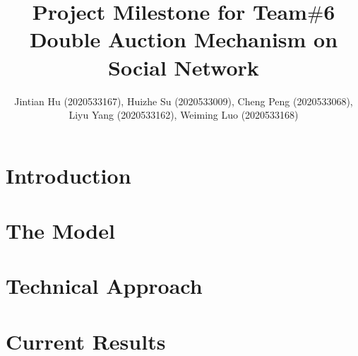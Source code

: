 \documentclass[format=acmsmall, review=false, natbib=false]{acmart}
\title{Project Milestone for Team$\#$6\\
	Double Auction Mechanism on Social Network
}
\author{Jintian Hu (2020533167), Huizhe Su (2020533009), Cheng Peng (2020533068), Liyu Yang (2020533162), Weiming Luo (2020533168)}
\begin{document}
\maketitle

\section{Introduction}


\section{The Model}


\section{Technical Approach}


\section{Current Results}


\nocite{*}
\printbibliography
\end{document}
